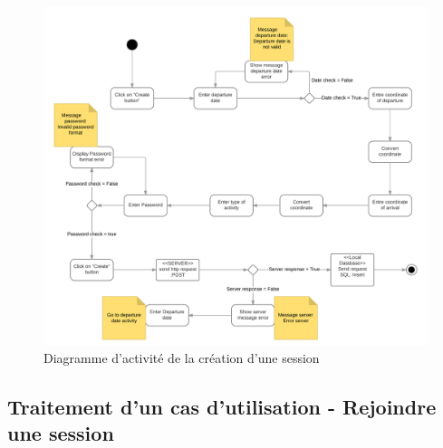 \documentclass[titlepage, 12pt]{report}
\begin{document}

\begin{figure}[!h]
	\caption{Diagramme d'activité de la création d'une session}
	\label{create_session_activity_diagram}
	\centering
	\includegraphics[scale=0.5]{Images/diagram/create_session_activity_diagram.png}
\end{figure}

\subsection{Traitement d'un cas d'utilisation - Rejoindre une session}

\clearpage

\end{document}
